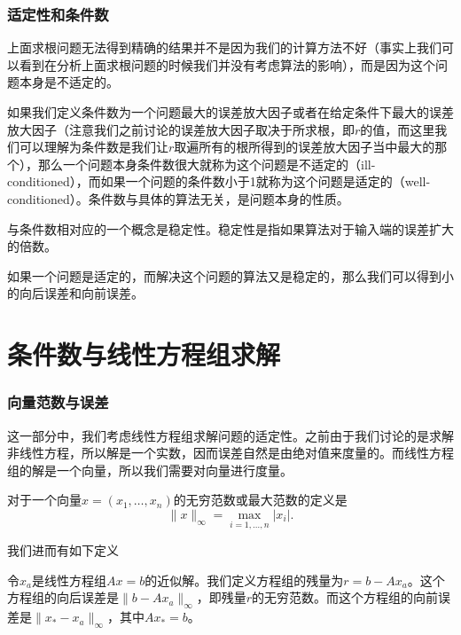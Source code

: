 \documentclass[10pt]{beamer}
\begin{document}
\begin{frame}
\frametitle{适定性和条件数}
上面求根问题无法得到精确的结果并不是因为我们的计算方法不好（事实上我们可以看到在分析上面求根问题的时候我们并没有考虑算法的影响），而是因为这个问题本身是不适定的。

\vspace{0.2cm}
如果我们定义条件数为一个问题最大的误差放大因子或者在给定条件下最大的误差放大因子（注意我们之前讨论的误差放大因子取决于所求根，即$r$的值，而这里我们可以理解为条件数是我们让$r$取遍所有的根所得到的误差放大因子当中最大的那个），那么一个问题本身条件数很大就称为这个问题是不适定的（ill-conditioned），而如果一个问题的条件数小于1就称为这个问题是适定的（well-conditioned）。条件数与具体的算法无关，是问题本身的性质。

\vspace{0.2cm}
与条件数相对应的一个概念是稳定性。稳定性是指如果算法对于输入端的误差扩大的倍数。

\vspace{0.2cm}
如果一个问题是适定的，而解决这个问题的算法又是稳定的，那么我们可以得到小的向后误差和向前误差。
\end{frame}




\section{条件数与线性方程组求解}


\begin{frame}
\frametitle{向量范数与误差}
这一部分中，我们考虑线性方程组求解问题的适定性。之前由于我们讨论的是求解非线性方程，所以解是一个实数，因而误差自然是由绝对值来度量的。而线性方程组的解是一个向量，所以我们需要对向量进行度量。

\begin{definition}[无穷范数]
对于一个向量$x = (x_1, \ldots, x_n)$的无穷范数或最大范数的定义是
\begin{equation}
\|x\|_{\infty} = \max_{i = 1, \ldots, n} |x_i|.
\end{equation}
\end{definition}
我们进而有如下定义
\begin{definition}[残量、向前与向后误差]
令$x_a$是线性方程组$Ax = b$的近似解。我们定义方程组的残量为$r = b - Ax_a$。这个方程组的向后误差是$\| b - A x_a\|_{\infty}$，即残量$r$的无穷范数。而这个方程组的向前误差是$\| x_*- x_a\|_{\infty}$，其中$Ax_* = b$。
\end{definition}
\end{frame}
\end{document}
